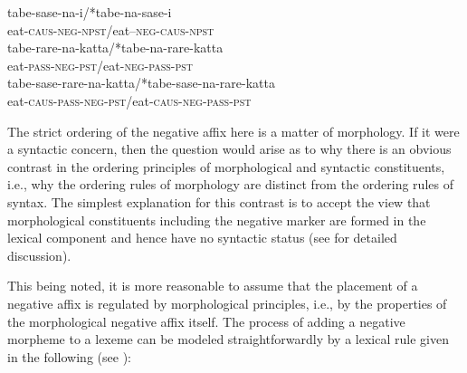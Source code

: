\documentclass[output=paper
	        ,collection
	        ,collectionchapter
 	        ,biblatex
                ,babelshorthands
                ,newtxmath
                ,draftmode
                ,colorlinks, citecolor=brown
]{langscibook}
\begin{document}
{\begin{exe}
\begin{xlist}
\begin{exe}
\begin{xlist}
\eal
\ex
\gll tabe-sase-na-i/*tabe-na-sase-i \\
     eat-\textsc{caus}-\textsc{neg}-\textsc{npst}/eat--\textsc{neg}-\textsc{caus}-\textsc{npst} \\

\ex
\gll tabe-rare-na-katta/*tabe-na-rare-katta \\
     eat-\textsc{pass}-\textsc{neg}-\textsc{pst}/eat-\textsc{neg}-\textsc{pass}-\textsc{pst} \\

\ex
\gll tabe-sase-rare-na-katta/*tabe-sase-na-rare-katta \\
     eat-\textsc{caus}-\textsc{pass}-\textsc{neg}-\textsc{pst}/eat-\textsc{caus}-\textsc{neg}-\textsc{pass}-\textsc{pst}\\
\zl

\noindent
The strict ordering of the negative affix here is a matter of morphology.
If it were a syntactic concern, then
the question would arise as to why
there is an obvious contrast in the ordering principles
of morphological and syntactic constituents, i.e., why the ordering
rules of morphology are distinct from the ordering rules of syntax. The
simplest explanation for this contrast is to accept
the view that morphological constituents including the negative marker
are formed in the lexical component and hence have no syntactic
status (see \citealt[Chapter~2]{Kim:00} for detailed discussion).

This being noted, it is more reasonable to assume that the placement of a
negative affix is regulated by morphological principles, i.e., by
the properties of the morphological negative affix itself.
%
%
The process of adding a negative morpheme to a lexeme can be modeled
straightforwardly by a lexical rule given in the following (see \citealt{Kim:00,Crowgey:12}):


\end{xlist}
\end{exe}
\end{xlist}
\end{exe}}
\end{document}
